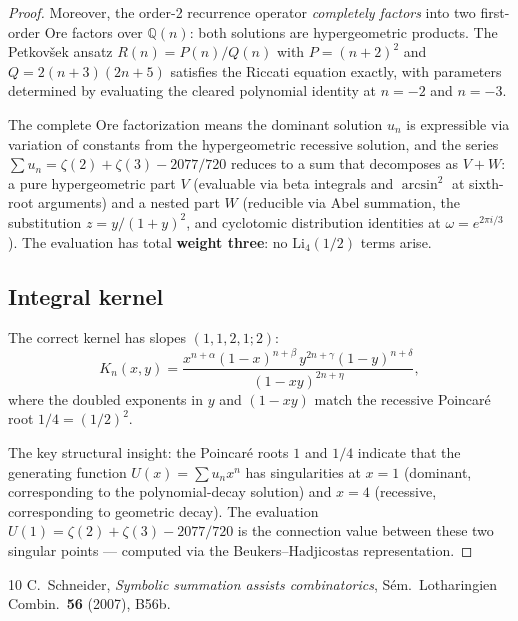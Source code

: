\documentclass[11pt]{article}
\begin{document}
\begin{proof}
Moreover, the order-2 recurrence operator \emph{completely factors}
into two first-order Ore factors over $\mathbb{Q}(n)$:
both solutions are hypergeometric products.  The Petkov\v{s}ek
ansatz $R(n) = P(n)/Q(n)$ with $P = (n+2)^2$ and
$Q = 2(n+3)(2n+5)$ satisfies the Riccati equation exactly,
with parameters determined by evaluating the cleared polynomial
identity at $n = -2$ and $n = -3$.

The complete Ore factorization means the dominant solution
$u_n$ is expressible via variation of constants from
the hypergeometric recessive solution, and the series
$\sum u_n = \zeta(2) + \zeta(3) - 2077/720$ reduces to
a sum that decomposes as $V + W$: a pure hypergeometric part $V$
(evaluable via beta integrals and $\arcsin^2$ at sixth-root
arguments) and a nested part $W$ (reducible via Abel summation,
the substitution $z = y/(1+y)^2$, and cyclotomic distribution
identities at $\omega = e^{2\pi i/3}$).
The evaluation has total \textbf{weight three}: no
$\mathrm{Li}_4(1/2)$ terms arise.

\subsection{Integral kernel}

The correct kernel has slopes $(1,1,2,1;2)$:
\[
K_n(x,y) = \frac{x^{n+\alpha}(1-x)^{n+\beta}\,
  y^{2n+\gamma}(1-y)^{n+\delta}}{(1-xy)^{2n+\eta}},
\]
where the doubled exponents in $y$ and $(1-xy)$ match the
recessive Poincar\'e root $1/4 = (1/2)^2$.

The key structural insight: the Poincar\'e roots $1$ and $1/4$
indicate that the generating function $U(x) = \sum u_n x^n$
has singularities at $x = 1$ (dominant, corresponding to the
polynomial-decay solution) and $x = 4$ (recessive, corresponding
to geometric decay).  The evaluation $U(1) = \zeta(2) + \zeta(3)
- 2077/720$ is the connection value between these two singular
points --- computed via the Beukers--Hadjicostas representation.
\end{proof}

\begin{thebibliography}{10}
C.~Schneider,
\emph{Symbolic summation assists combinatorics},
S\'em.\ Lotharingien Combin.\ \textbf{56} (2007), B56b.
\end{thebibliography}
\end{document}
